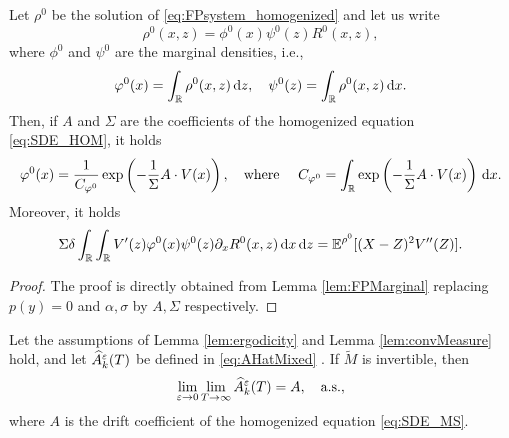 \documentclass[10pt]{article}
\begin{document}
\begin{corollary}\label{lem:FPMarginal_Hom} Let $\rho^0$ be the solution of \eqref{eq:FPsystem_homogenized} and let us write 
	\begin{equation}
		\rho^0(x, z) = \phi^0(x)\psi^0(z)R^0(x,z),
	\end{equation}
	where $\phi^0$ and $\psi^0$ are the marginal densities, i.e., 
	\begin{equation}
		\varphi^0(x) = \int_{\mathbb{R}} \rho^0(x,z) \,\mathrm{d} z, \quad \psi^0(z) = \int_{\mathbb{R}} \rho^0(x,z) \,\mathrm{d} x.
	\end{equation}
	Then, if $A$ and $\Sigma$ are the coefficients of the homogenized equation \eqref{eq:SDE_HOM}, it holds
	\begin{equation} \label{eq:phi0}
		\varphi^0(x) = \frac{1}{C_{\varphi^0}} \exp\left(- \frac1{\Sigma} A\cdot V(x)\right), \quad \text{where } \quad C_{\varphi^0} = \int_{\mathbb{R}} \exp\left(- \frac1{\Sigma} A\cdot V(x) \right) \,\mathrm{d} x.
	\end{equation}
	Moreover, it holds
	\begin{equation}
		\Sigma \delta \int_{\mathbb{R}} \int_{\mathbb{R}} V'(z) \varphi^0(x) \psi^0(z) \partial_x R^0(x,z) \,\mathrm{d} x \,\mathrm{d} z = \operatorname{\mathbb{E}}^{\rho^0}[(X - Z)^2 V''(Z)].
	\end{equation}
\end{corollary}
\begin{proof} The proof is directly obtained from Lemma \ref{lem:FPMarginal} replacing $p(y)=0$ and $\alpha, \sigma$ by $A, \Sigma$ respectively. 
\end{proof}


\begin{theorem}\label{thm:mainTheorem} Let the assumptions of Lemma \ref{lem:ergodicity} and Lemma \ref{lem:convMeasure} hold, and let $\widehat A^\varepsilon_k(T)$ be defined in \eqref{eq:AHatMixed} . If $\widetilde M$ is invertible, then
	\begin{equation}
	\lim_{\varepsilon \to 0} \lim_{T \to \infty} \widehat A_k^\varepsilon(T) = A, \quad \text{a.s.},
	\end{equation}
	where $A$ is the drift coefficient of the homogenized equation \eqref{eq:SDE_MS}.
\end{theorem}
\end{document}

